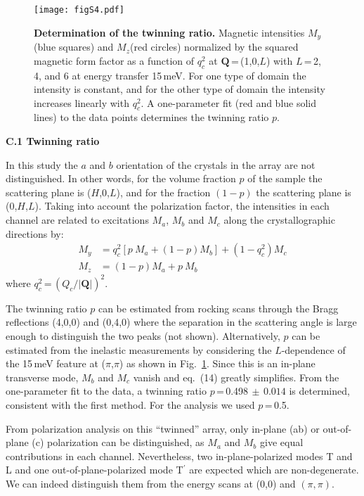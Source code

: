 \documentclass[twocolumn,prb,aps,showpacs]{revtex4-1}
\begin{document}
\begin{figure}
\renewcommand{\thefigure}{S\arabic{figure}}
  \centering
  \texttt{[image: figS4.pdf]}

  \caption{{\bf Determination of the twinning ratio.} Magnetic intensities $M_y$(blue squares) and $M_z$(red circles) normalized by the squared magnetic form factor as a function of $q_c^2$ at $\mathbf{Q}$\,=\,(1,0,$L$) with $L$\,=\,2, 4, and 6 at energy transfer 15\,meV. For one type of domain the intensity is constant, and for the other type of domain the intensity increases linearly with $q_c^2$. A one-parameter fit (red and blue solid lines) to the data points determines the twinning ratio $p$.}
\label{Fig:twin_ratio}
\end{figure}

\vspace{10 pt}
\noindent
{\bf C.1 Twinning ratio}

\vspace{10 pt}
\noindent
In this study the $a$ and $b$ orientation of the crystals in the array are not distinguished. In other words, for the volume fraction $p$ of the sample the scattering plane is ($H$,0,$L$), and for the fraction $(1-p)$ the scattering plane is (0,$H$,$L$). Taking into account the polarization factor, the intensities in each channel are related to excitations $M_{a}$, $M_{b}$ and $M_{c}$ along the crystallographic directions by:
%
\begin{align}
 M_{y} &= q_c^2 \left[ p~M_{a} + \left(1-p \right) M_{b} \right] + \left(1-q_c^2\right) M_{c}\\ \nonumber
 M_{z} &= \left(1-p \right) M_{a} + p~M_{b}
\end{align}
%
where $q_c^2$\,=\,$\left(Q_c/\lvert\mathbf{Q}\rvert\right)^2$.

The twinning ratio $p$ can be estimated from rocking scans through the Bragg reflections (4,0,0) and (0,4,0) where the separation in the scattering angle is large enough to distinguish the two peaks (not shown). Alternatively, $p$ can be estimated from the inelastic measurements by considering the $L$-dependence of the 15\,meV feature at ($\pi$,$\pi$) as shown in Fig.~\ref{Fig:twin_ratio}. Since this is an in-plane transverse mode, $M_b$ and $M_c$ vanish and eq.~(14) greatly simplifies. From the one-parameter fit to the data, a twinning ratio $p$\,=\,0.498$\,\pm\,0.014$ is determined, consistent with the first method. For the analysis we used $p$\,=\,0.5. 

From polarization analysis on this ``twinned'' array, only in-plane (ab) or out-of-plane (c) polarization can be distinguished, as $M_{a}$ and $M_{b}$ give equal contributions in each channel. Nevertheless, two in-plane-polarized modes T and L and one out-of-plane-polarized mode T$^\prime$  are expected which are non-degenerate. We can indeed distinguish them from the energy scans at (0,0) and $(\pi,\pi)$.
\end{document}
